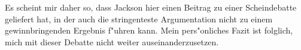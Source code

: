\documentclass[a4paper, emulatestandardclasses, 12pt]{scrartcl}
\begin{document}
\begin{onehalfspace}
Es scheint mir daher so, dass Jackson hier einen Beitrag zu einer Scheindebatte geliefert hat, in der auch die stringenteste Argumentation nicht zu einem gewinnbringenden Ergebnis f"uhren kann. Mein pers"onliches Fazit ist folglich, mich mit dieser Debatte nicht weiter auseinanderzusetzen.




\end{onehalfspace}

\end{document}
